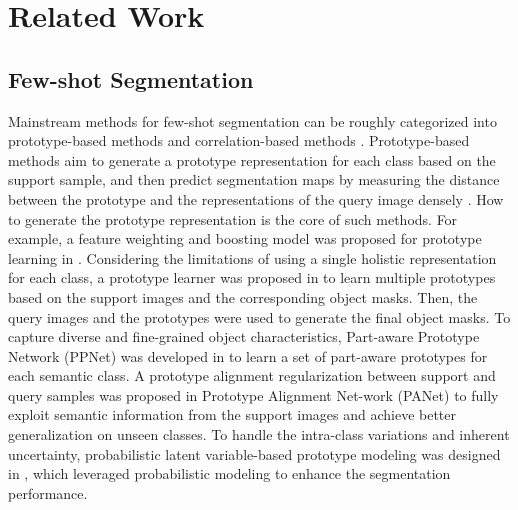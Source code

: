 \documentclass[runningheads]{llncs}
\begin{document}
\section{Related Work}
\subsection{Few-shot Segmentation}
Mainstream methods for few-shot segmentation can be roughly categorized into prototype-based methods \cite{yang2020prototype,wang2019panet,liu2020part,dong2018few} and correlation-based methods \cite{yang2020new,hu2019attention,zhang2019pyramid,wang2020few}. Prototype-based methods aim to generate a prototype representation \cite{snell2017prototypical} for each class based on the support sample, and then predict segmentation maps by measuring the distance between the prototype and the representations of the query image densely \cite{zhang2020sg,dong2018few,wang2019panet}. How to generate the prototype representation is the core of such methods. For example, a feature weighting and boosting model was proposed for prototype learning in \cite{nguyen2019feature}. Considering the limitations of using a single holistic representation for each class, a prototype learner was proposed in \cite{yang2020prototype} to learn multiple prototypes based on the support images and the corresponding object masks. Then, the query images and the prototypes were used to generate the final object masks. To capture diverse and fine-grained object characteristics, Part-aware Prototype Network (PPNet) was developed in \cite{liu2020part} to learn a set of part-aware prototypes for each semantic class. A prototype alignment regularization between support and query samples was proposed in Prototype Alignment Net-work (PANet) \cite{wang2019panet} to fully exploit semantic information from the support images and achieve better generalization on unseen classes. To handle the intra-class variations and inherent uncertainty, probabilistic latent variable-based prototype modeling was designed in \cite{sun2021attentional,wang2021variational}, which leveraged probabilistic modeling to enhance the segmentation performance.
\end{document}
